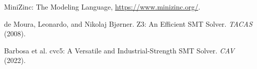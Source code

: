 \documentclass{article}
\begin{document}
\begin{thebibliography}{9}

MiniZinc: The Modeling Language,
\url{https://www.minizinc.org/}.

de Moura, Leonardo, and Nikolaj Bj{\o}rner.
Z3: An Efficient SMT Solver.
\emph{TACAS} (2008).

Barbosa et al.
cvc5: A Versatile and Industrial-Strength SMT Solver.
\emph{CAV} (2022).

\end{thebibliography}
\end{document}
